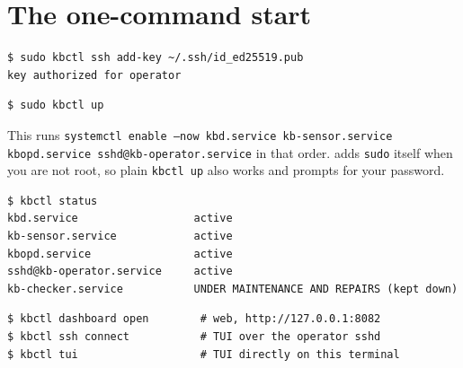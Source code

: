 \section{The one-command start}
\resetsteps
{}
\begin{lstlisting}[style=console]
$ sudo kbctl ssh add-key ~/.ssh/id_ed25519.pub
key authorized for operator
\end{lstlisting}
\begin{lstlisting}[style=console]
$ sudo kbctl up
\end{lstlisting}
This runs \texttt{systemctl enable --now kbd.service kb-sensor.service kbopd.service sshd@kb-operator.service}
in that order.  adds \texttt{sudo} itself when you are not root, so plain \texttt{kbctl up} also works
and prompts for your password.
\begin{lstlisting}[style=console]
$ kbctl status
kbd.service                  active
kb-sensor.service            active
kbopd.service                active
sshd@kb-operator.service     active
kb-checker.service           UNDER MAINTENANCE AND REPAIRS (kept down)
\end{lstlisting}
\begin{lstlisting}[style=console]
$ kbctl dashboard open        # web, http://127.0.0.1:8082
$ kbctl ssh connect           # TUI over the operator sshd
$ kbctl tui                   # TUI directly on this terminal
\end{lstlisting}


